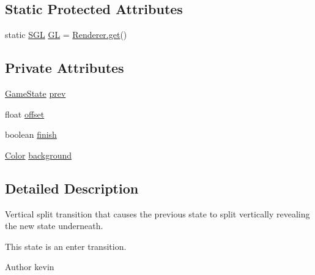 \subsection*{Static Protected Attributes}
\begin{DoxyCompactItemize}
\item 
static \mbox{\hyperlink{interfaceorg_1_1newdawn_1_1slick_1_1opengl_1_1renderer_1_1_s_g_l}{S\+GL}} \mbox{\hyperlink{classorg_1_1newdawn_1_1slick_1_1state_1_1transition_1_1_vertical_split_transition_aa87f4e1f0f05275ebc4d04664bff7d27}{GL}} = \mbox{\hyperlink{classorg_1_1newdawn_1_1slick_1_1opengl_1_1renderer_1_1_renderer_abe742c3a7dfca67c6c01821d27087308}{Renderer.\+get}}()
\end{DoxyCompactItemize}
\subsection*{Private Attributes}
\begin{DoxyCompactItemize}
\item 
\mbox{\hyperlink{interfaceorg_1_1newdawn_1_1slick_1_1state_1_1_game_state}{Game\+State}} \mbox{\hyperlink{classorg_1_1newdawn_1_1slick_1_1state_1_1transition_1_1_vertical_split_transition_ac864a869b7644faded54193f3aa2b436}{prev}}
\item 
float \mbox{\hyperlink{classorg_1_1newdawn_1_1slick_1_1state_1_1transition_1_1_vertical_split_transition_aa6cdad04029a3955ec1d84b0a2f06e56}{offset}}
\item 
boolean \mbox{\hyperlink{classorg_1_1newdawn_1_1slick_1_1state_1_1transition_1_1_vertical_split_transition_ade40e19759a22b7b524807868c8992a4}{finish}}
\item 
\mbox{\hyperlink{classorg_1_1newdawn_1_1slick_1_1_color}{Color}} \mbox{\hyperlink{classorg_1_1newdawn_1_1slick_1_1state_1_1transition_1_1_vertical_split_transition_ab060d40f8fccd5b704cdfe466e1df6ea}{background}}
\end{DoxyCompactItemize}


\subsection{Detailed Description}
Vertical split transition that causes the previous state to split vertically revealing the new state underneath.

This state is an enter transition.

\begin{DoxyAuthor}{Author}
kevin 
\end{DoxyAuthor}


